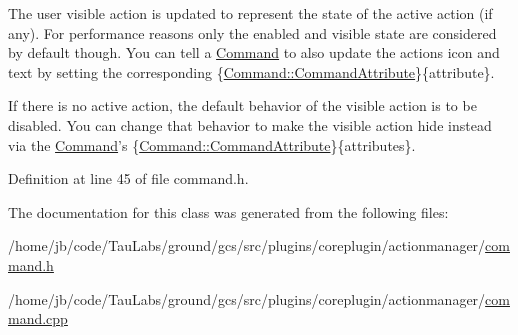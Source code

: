 \-The user visible action is updated to represent the state of the active action (if any). \-For performance reasons only the enabled and visible state are considered by default though. \-You can tell a \hyperlink{class_core_1_1_command}{\-Command} to also update the actions icon and text by setting the corresponding \{\hyperlink{group___core_plugin_ga4d899c1f711159a432afeab3eb78c917}{\-Command\-::\-Command\-Attribute}\}\{attribute\}.

\-If there is no active action, the default behavior of the visible action is to be disabled. \-You can change that behavior to make the visible action hide instead via the \hyperlink{class_core_1_1_command}{\-Command}'s \{\hyperlink{group___core_plugin_ga4d899c1f711159a432afeab3eb78c917}{\-Command\-::\-Command\-Attribute}\}\{attributes\}. 

\-Definition at line 45 of file command.\-h.



\-The documentation for this class was generated from the following files\-:\begin{DoxyCompactItemize}
\item 
/home/jb/code/\-Tau\-Labs/ground/gcs/src/plugins/coreplugin/actionmanager/\hyperlink{command_8h}{command.\-h}\item 
/home/jb/code/\-Tau\-Labs/ground/gcs/src/plugins/coreplugin/actionmanager/\hyperlink{command_8cpp}{command.\-cpp}\end{DoxyCompactItemize}
